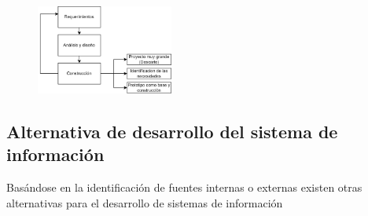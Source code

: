 \documentclass{templateNote}
\begin{document}
\begin{figure}[H]
    \centering
    \includegraphics[width=0.4\textwidth]{img/Prototipo.png}
\end{figure}
\newpage

\subsection{Alternativa de desarrollo del sistema de información}
\noindent Basándose en la identificación de fuentes internas o externas existen otras alternativas para el desarrollo de sistemas de información
\end{document}
